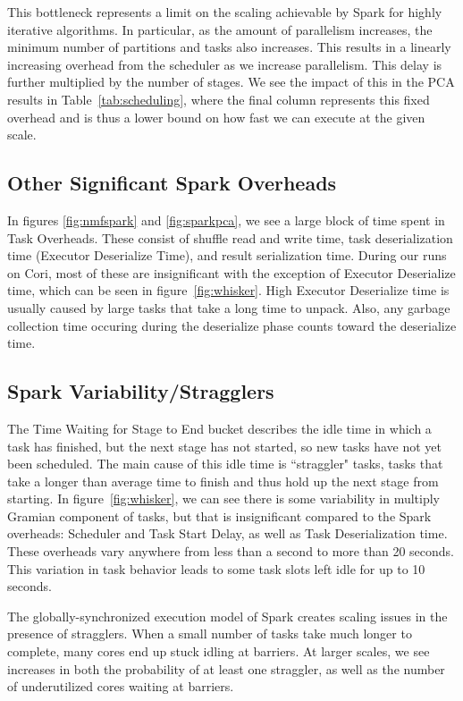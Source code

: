 This bottleneck represents a limit on the scaling achievable by Spark for highly iterative algorithms.  In particular, as the amount of parallelism increases, the minimum number of partitions and tasks also increases.  This results in a linearly increasing overhead from the scheduler as we increase parallelism.  This delay is further multiplied by the number of stages.  We see the impact of this in the PCA results in Table~\ref{tab:scheduling}, where the final column represents this fixed overhead and is thus a lower bound on how fast we can execute at the given scale.  
\subsection{Other Significant Spark Overheads}
In figures \ref{fig:nmfspark} and \ref{fig:sparkpca}, we see a large block of time spent in Task Overheads. These consist of  shuffle read and write time, task deserialization time (Executor Deserialize Time), and result serialization time.  During our runs on Cori, most of these are insignificant with the exception of Executor Deserialize time, which can be seen in  figure~\ref{fig:whisker}.  High Executor Deserialize time is usually caused by large tasks that take a long time to unpack. Also, any garbage collection time occuring during the deserialize phase counts toward the deserialize time.
\subsection{Spark Variability/Stragglers}
The Time Waiting for Stage to End bucket describes the idle time in which a task has finished, but the next stage has not started, so new tasks have not yet been scheduled. The main cause of this idle time is ``straggler" tasks, tasks that take a longer than average time to finish and thus hold up the next stage from starting. In figure~\ref{fig:whisker}, we can see there is some variability in multiply Gramian component of tasks, but that is insignificant compared to the Spark overheads: Scheduler and Task Start Delay, as well as Task Deserialization time. These overheads vary anywhere from less than a second to more than 20 seconds. This variation in task behavior leads to some task slots left idle for up to 10 seconds.

The globally-synchronized execution model of Spark creates scaling issues in the presence of stragglers. When a small number of tasks take much longer to complete, many cores end up stuck idling at barriers. At larger scales, we see increases in both the probability of at least one straggler, as well as the number of underutilized cores waiting at barriers.


